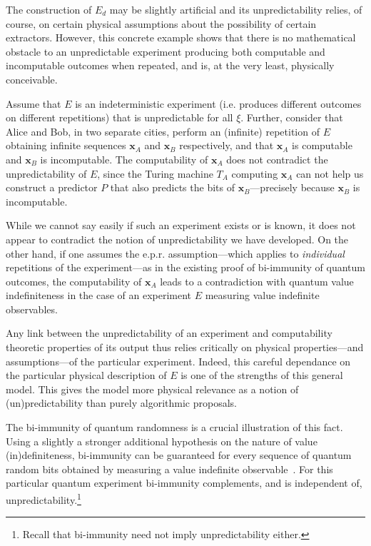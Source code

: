 \documentclass[%
 superscriptaddress,
 preprint,
 showpacs,
 showkeys,
 preprintnumbers,
 nofootinbib,
  amsmath,amssymb,
  aps,
 pra,
  longbibliography,
  floatfix,
 ]{revtex4-1}
\theoremstyle{definition}
\newcommand{\x}{\mathbf{x}}
\begin{document}
The construction of $E_d$  may be slightly artificial and its unpredictability relies, of course, on certain physical assumptions about the possibility of certain extractors.
However, this concrete example shows that there is no mathematical obstacle to an unpredictable experiment producing both computable and incomputable outcomes when repeated, and is, at the very least, physically conceivable.

Assume that $E$ is an indeterministic experiment (i.e. produces different outcomes on different repetitions) that is unpredictable for all $\xi$.
Further, consider that Alice and Bob, in two separate cities, perform an (infinite) repetition of $E$ obtaining infinite sequences $\x_A$ and $\x_B$ respectively, and that $\x_A$ is computable and $\x_B$ is incomputable.
The computability of $\x_A$ does not contradict the unpredictability of $E$, since the Turing machine $T_A$ computing $\x_A$ can not help us construct a predictor $P$ that also predicts the bits of $\x_B$---precisely because $\x_B$ is incomputable.

While we cannot say easily if such an experiment exists or is known, it does not appear to contradict the notion of unpredictability we have developed.
On the other hand, if one assumes the e.p.r. assumption---which applies to \emph{individual} repetitions of the experiment---as in the existing proof of bi-immunity of quantum outcomes, the computability of $\x_A$ leads to a contradiction with quantum value indefiniteness in the case of an experiment $E$ measuring value indefinite observables.
\fi

Any link between the unpredictability of an experiment and computability theoretic properties of its output thus relies critically on physical properties---and assumptions---of the particular experiment.
Indeed, this careful dependance on the particular physical description of $E$ is one of the strengths of this general model. This gives the model more physical relevance as a notion of (un)predictability than purely algorithmic proposals.

The bi-immunity of quantum randomness is a crucial illustration of this fact.
Using a slightly a stronger additional 
hypothesis on the nature of value (in)definiteness,  bi-immunity can be guaranteed for every sequence of quantum random bits obtained by measuring a value indefinite observable~\cite{2012-incomput-proofsCJ}.
 For this particular quantum experiment bi-immunity complements, and is  independent of, unpredictability.\footnote{Recall that   bi-immunity need not imply unpredictability either.} 
\end{document}
